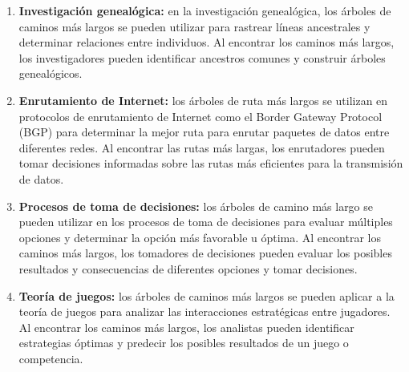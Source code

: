 \begin{enumerate}
	\item \textbf{Investigación genealógica:} en la investigación genealógica, los árboles de caminos más largos se pueden utilizar para rastrear líneas ancestrales y determinar relaciones entre individuos. Al encontrar los caminos más largos, los investigadores pueden identificar ancestros comunes y construir árboles genealógicos.
	\item \textbf{ Enrutamiento de Internet:} los árboles de ruta más largos se utilizan en protocolos de enrutamiento de Internet como el Border Gateway Protocol (BGP) para determinar la mejor ruta para enrutar paquetes de datos entre diferentes redes. Al encontrar las rutas más largas, los enrutadores pueden tomar decisiones informadas sobre las rutas más eficientes para la transmisión de datos.
	\item \textbf{Procesos de toma de decisiones:} los árboles de camino más largo se pueden utilizar en los procesos de toma de decisiones para evaluar múltiples opciones y determinar la opción más favorable u óptima. Al encontrar los caminos más largos, los tomadores de decisiones pueden evaluar los posibles resultados y consecuencias de diferentes opciones y tomar decisiones.
	\item \textbf{Teoría de juegos:} los árboles de caminos más largos se pueden aplicar a la teoría de juegos para analizar las interacciones estratégicas entre jugadores. Al encontrar los caminos más largos, los analistas pueden identificar estrategias óptimas y predecir los posibles resultados de un juego o competencia.
\end{enumerate}
